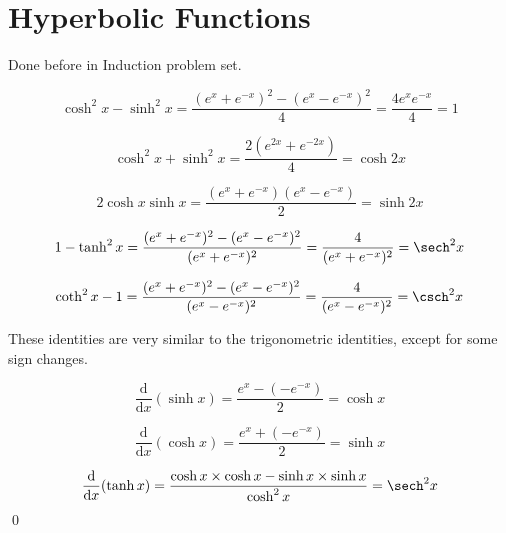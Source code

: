 \documentclass[12pt]{article}
\begin{document}



\pagebreak
\section*{Hyperbolic Functions}



Done before in Induction problem set.


\begin{equation}
    \cosh^{2}{x} - \sinh^{2}{x} = \frac{(e^{x} + e^{-x})^{2} - (e^{x} - e^{-x})^{2}}{4} = \frac{4e^{x} e^{-x}}{4} = 1
\end{equation}

\begin{equation}
    \cosh^{2}{x} + \sinh^{2}{x} = \frac{2(e^{2x} + e^{-2x})}{4} = \cosh{2x}
\end{equation}

\begin{equation}
    2\cosh{x} \sinh{x} = \frac{(e^{x} + e^{-x})(e^{x} - e^{-x})}{2} = \sinh{2x}
\end{equation}

\begin{equation}
    1 - \tanh^{2}{x} = \frac{(e^{x} + e^{-x})^{2} - (e^{x} - e^{-x})^{2}}{(e^{x} + e^{-x})^{2}} = \frac{4}{(e^{x} + e^{-x})^{2}} = \sech^{2}{x}
\end{equation}

\begin{equation}
    \coth^{2}{x} - 1 = \frac{(e^{x} + e^{-x})^{2} - (e^{x} - e^{-x})^{2}}{(e^{x} - e^{-x})^{2}} = \frac{4}{(e^{x} - e^{-x})^{2}} = \csch^{2}{x}
\end{equation}

These identities are very similar to the trigonometric identities, except for some sign changes.


\begin{equation}
    \frac{\mathrm{d}}{\mathrm{d}x} (\sinh{x}) = \frac{e^{x} - (-e^{-x})}{2} = \cosh{x}
\end{equation}

\begin{equation}
    \frac{\mathrm{d}}{\mathrm{d}x} (\cosh{x}) = \frac{e^{x} + (-e^{-x})}{2} = \sinh{x}
\end{equation}

\begin{equation}
    \frac{\mathrm{d}}{\mathrm{d}x} (\tanh{x}) = \frac{\cosh{x} \times \cosh{x} - \sinh{x} \times \sinh{x}}{\cosh^{2}{x}} = \sech^{2}{x}
\end{equation}
\qed
\end{document}
